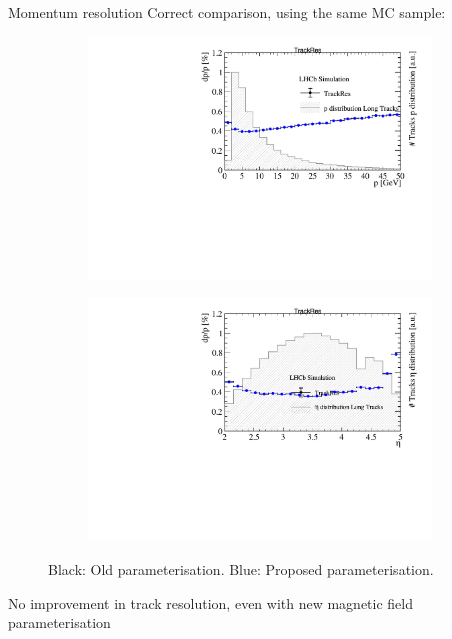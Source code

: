 \documentclass[xcolor={dvipsnames}]{beamer}
\begin{document}
\begin{frame}{Momentum resolution}
  \vspace{0.0cm}
  {\Large Correct comparison, using the same MC sample:}
  \begin{figure}[htb]
    \centering
    \begin{subfigure}{0.50\textwidth}
      \includegraphics[width=1\textwidth]{Plots/Track_resolution_p_comparison.pdf}
    \end{subfigure}%
    \begin{subfigure}{0.50\textwidth}
      \includegraphics[width=1\textwidth]{Plots/Track_resolution_eta_comparison.pdf}
    \end{subfigure}
    \vspace{-0.2cm}
    \caption*{Black: Old parameterisation. {\color{blue}Blue: Proposed parameterisation}.}
  \end{figure}
  {\Large No improvement in track resolution, even with new magnetic field parameterisation}
\end{frame}
\end{document}

